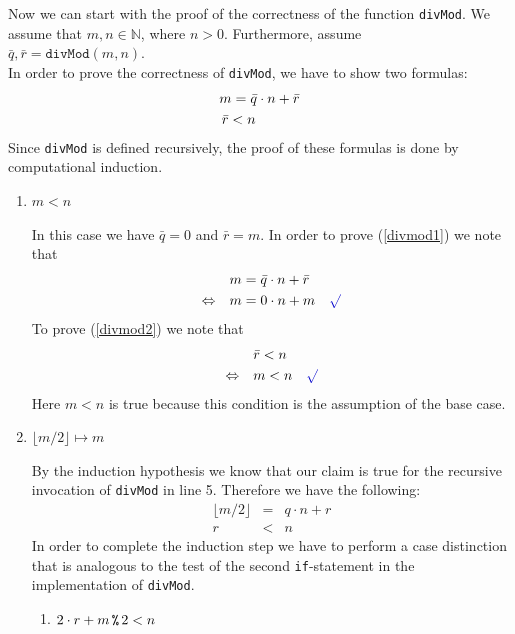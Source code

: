 Now we can start with the proof of the correctness of the function \texttt{divMod}. We assume
that $m,n \in\mathbb{N}$, where $n > 0$.  Furthermore, assume 
\\[0.2cm]
\hspace*{1.3cm}
$\bar{q}, \bar{r} = \mathtt{divMod}(m, n)$.
\\[0.2cm] 
In order to prove the correctness of \texttt{divMod}, we have to show two formulas:
\begin{align}
m = \bar{q} \cdot n + \bar{r} \label{divmod1} \\
\bar{r} < n \hspace*{1.1cm} \label{divmod2}
\end{align}
Since \texttt{divMod} is defined recursively, the proof of these formulas is done by computational induction.
\begin{enumerate}
\item[B.C.:] $m < n$

  In this case we have $\bar{q} = 0$ and $\bar{r} = m$.
  In order to prove (\ref{divmod1}) we note that 
  \begin{align*}
                    & m = \bar{q} \cdot n + \bar{r} \\
    \Leftrightarrow\quad & m = 0 \cdot n + m \quad \green{\surd}
  \end{align*}
  To prove (\ref{divmod2}) we note that
  \begin{align*}
                         & \bar{r} < n \\
    \Leftrightarrow\quad & m < n \quad\green{\surd}
  \end{align*}
  Here $m < n$ is true because this condition is the assumption of the base case.
\item[I.S.:] $\lfloor m / 2 \rfloor \mapsto m$

  By the induction hypothesis we know that our claim is true for the recursive invocation of \texttt{divMod} in
  line 5.  Therefore we have the following:
  \begin{eqnarray}
    \lfloor m / 2 \rfloor &\!=\! & q \cdot n + r \label{divmod3} \\
                        r &\!<\! & n             \label{divmod4}
  \end{eqnarray}
  In order to complete the induction step we have to perform a case distinction that is analogous to the test
  of the second \texttt{if}-statement in the implementation of \texttt{divMod}.
  \begin{enumerate}
  \item $2 \cdot r + m \,\texttt{\%}\, 2 < n$


\end{enumerate}
\end{enumerate}
